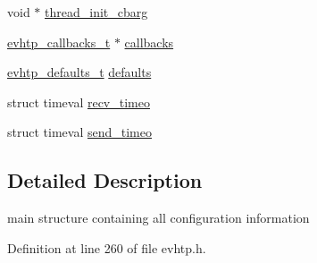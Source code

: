 \begin{DoxyCompactItemize}
void $\ast$ \hyperlink{structevhtp__s_aa7d8ed7967f5071085f57741dde79056}{thread\-\_\-init\-\_\-cbarg}
\item 
\hyperlink{evhtp_8h_a9570ba758e99f90fc29f4b427953e6a5}{evhtp\-\_\-callbacks\-\_\-t} $\ast$ \hyperlink{structevhtp__s_a43bc08d49284feb774b73ee06cf0a769}{callbacks}
\item 
\hyperlink{evhtp_8h_ac6661001dc475c8e25760071e26311e1}{evhtp\-\_\-defaults\-\_\-t} \hyperlink{structevhtp__s_a5ca39f6268aea8173dbdc0a1e297925b}{defaults}
\item 
struct timeval \hyperlink{structevhtp__s_a485801666b7fb0cccc50d9fa42e5cbb9}{recv\-\_\-timeo}
\item 
struct timeval \hyperlink{structevhtp__s_a7ffa291d73974047489f8880e5363603}{send\-\_\-timeo}
\end{DoxyCompactItemize}


\subsection{\-Detailed \-Description}
main structure containing all configuration information 

\-Definition at line 260 of file evhtp.\-h.



